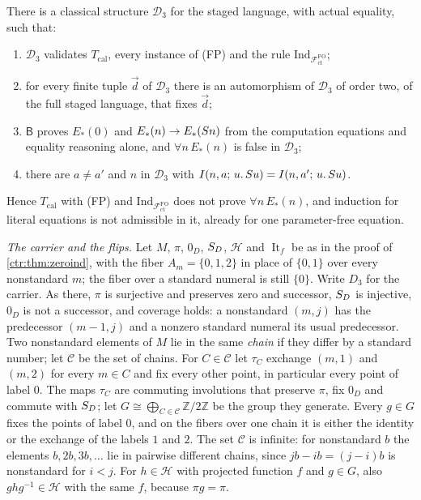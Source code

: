 \begin{theorem}
\label{obs:thm:numbering-parameters}
There is a classical structure $\mathcal{D}_3$ for the staged language, with
actual equality, such that:
\begin{enumerate}[label=(\roman*)]
\item $\mathcal{D}_3$ validates $T_{\mathrm{cal}}$, every instance of (FP) and
the rule $\mathrm{Ind}_{\mathcal{F}^{\mathrm{FO}}_{\mathrm{ct}}}$;
\item for every finite tuple $\vec d$ of $\mathcal{D}_3$ there is an
automorphism of $\mathcal{D}_3$ of order two, of the full staged language, that
fixes $\vec d$;
\item $\mathsf{B}$ proves $E_{*}(0)$ and $E_{*}(n)\to E_{*}(S n)$ from the
computation equations and equality reasoning alone, and $\forall n\,E_{*}(n)$
is false in $\mathcal{D}_3$;
\item there are $a\ne a'$ and $n$ in $\mathcal{D}_3$ with
$I(n,a;\,u.\,S u)=I(n,a';\,u.\,S u)$.
\end{enumerate}
Hence $T_{\mathrm{cal}}$ with (FP) and
$\mathrm{Ind}_{\mathcal{F}^{\mathrm{FO}}_{\mathrm{ct}}}$ does not prove
$\forall n\,E_{*}(n)$, and induction for literal equations is not admissible in
it, already for one parameter-free equation.
\end{theorem}

\emph{The carrier and the flips.} Let $M$, $\pi$, $0_D$, $S_D$, $\mathscr{H}$
and $\operatorname{It}_f$ be as in the proof of \cref{ctr:thm:zeroind}, with the
fiber $A_m=\{0,1,2\}$ in place of $\{0,1\}$ over every nonstandard $m$; the
fiber over a standard numeral is still $\{0\}$. Write $D_3$ for the carrier.
As there, $\pi$ is surjective and preserves zero and successor, $S_D$ is
injective, $0_D$ is not a successor, and coverage holds: a nonstandard $(m,j)$
has the predecessor $(m-1,j)$ and a nonzero standard numeral its usual
predecessor. Two nonstandard elements of $M$ lie in the same \emph{chain} if
they differ by a standard number; let $\mathcal{C}$ be the set of chains. For
$C\in\mathcal{C}$ let $\tau_C$ exchange $(m,1)$ and $(m,2)$ for every $m\in C$
and fix every other point, in particular every point of label $0$. The maps
$\tau_C$ are commuting involutions that preserve $\pi$, fix $0_D$ and commute
with $S_D$; let $G\cong\bigoplus_{C\in\mathcal{C}}\mathbb{Z}/2\mathbb{Z}$ be
the group they generate. Every $g\in G$ fixes the points of label $0$, and on
the fibers over one chain it is either the identity or the exchange of the
labels $1$ and $2$. The set $\mathcal{C}$ is infinite: for nonstandard $b$ the
elements $b,2b,3b,\dots$ lie in pairwise different chains, since $jb-ib=(j-i)b$
is nonstandard for $i<j$. For $h\in\mathscr{H}$ with projected function $f$ and
$g\in G$, also $ghg^{-1}\in\mathscr{H}$ with the same $f$, because $\pi g=\pi$.

